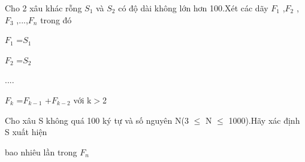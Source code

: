Cho 2 xâu khác rỗng $S_{1}$   và $S_{2}$   có độ dài không lớn hơn 100.Xét các dãy $F_{1}$   ,$F_{2}$   ,$F_{3}$   ,...,$F_{n}$   trong đó   


   $F_{1}$   =$S_{1}$


   $F_{2}$   =$S_{2}$


   ....   


   $F_{k}$   =$F_{k-1}$   +$F_{k-2}$   với k$>$2   


   Cho xâu S không quá 100 ký tự và số nguyên N(3 $\le$ N $\le$ 1000).Hãy xác định S xuất hiện   


   bao nhiêu lần trong $F_{n}$
